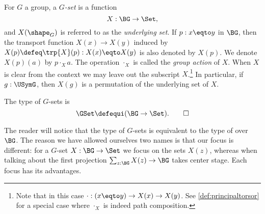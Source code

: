 
\begin{definition}\label{def:Gset}
  For $G$ a group, a \emph{$G$-set} is a function
  \[
    X : \BG\to\Set,
  \]
  and $X(\shape_G)$ is referred to as the \emph{underlying set}.
  If $p:x\eqto y$ in $\BG$,
  then the transport function $X(x)\to X(y)$ induced
  by $X(p)\defeq\trp{X}(p) : X(x)\eqto X(y)$ is also denoted by $X(p)$.
  We denote $X(p)(a)$ by $p\cdot_X a$.
  The operation $\cdot_X$ is called the \emph{group action} of $X$.
  When $X$ is clear from the context we may leave out the
  subscript $X$.\footnote{%
    Note that in this case $\cdot: (x\eqto y) \to X(x) \to X(y)$.
    See \cref{def:principaltorsor} for a special case
    where $\cdot_X$ is indeed path composition.}
  In particular, if $g:\USymG$,
  then $X(g)$ is a permutation of the underlying set of $X$.

  The type of $G$-sets is
  \[
    \GSet\defequi(\BG\to\Set).\qedhere
  \]
\end{definition}
\begin{remark}

The reader will notice that the type of $G$-sets is equivalent to the
type of \coverings over $\BG$.
The reason we have allowed ourselves two names is that our focus is different: for a $G$-set $X:\BG\to\Set$ we focus on the sets $X(z)$, whereas when talking about \coverings the first projection $\sum_{z:\BG}X(z)\to \BG$ takes center stage.  Each focus has its advantages.
\end{remark}

